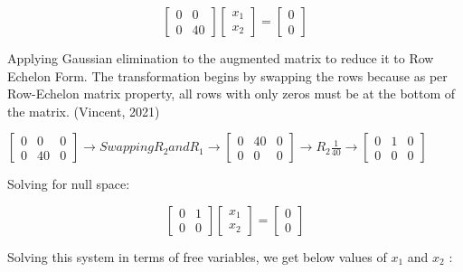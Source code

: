 \documentclass[a4paper]{report}
\begin{document}
\[ \begin{bmatrix}
    0&0\\0&40
\end{bmatrix} \begin{bmatrix}
    x_1\\x_2
\end{bmatrix}=\begin{bmatrix}
    0\\0
\end{bmatrix}\]

\vspace{5mm}

Applying Gaussian elimination to the augmented matrix to reduce it to Row Echelon Form. The transformation begins by swapping the rows because as per Row-Echelon matrix property, all rows with only zeros must be at the bottom of the matrix. (Vincent, 2021)

\vspace{5mm}

$\left [ \begin{array}{cc|c}
0&0&0\\0&40&0
\end{array} \right ] \rightarrow Swapping R_2 and R_1\rightarrow\left [ \begin{array}{cc|c}
0&40&0\\0&0&0
\end{array} \right ]\rightarrow R_2\frac{1}{40} \rightarrow \left [\begin{array}{cc|cc}
     0&1&0  \\
     0&0&0 
\end{array} \right]$

\vspace{8mm}

Solving for null space:

\[ \begin{bmatrix}
    0&1\\0&0
\end{bmatrix} \begin{bmatrix}
    x_1\\x_2
\end{bmatrix}=\begin{bmatrix}
    0\\0
\end{bmatrix}\]

\vspace{5mm}

Solving this system in terms of free variables, we get below values of $x_1$ and $x_2$ :
\end{document}

